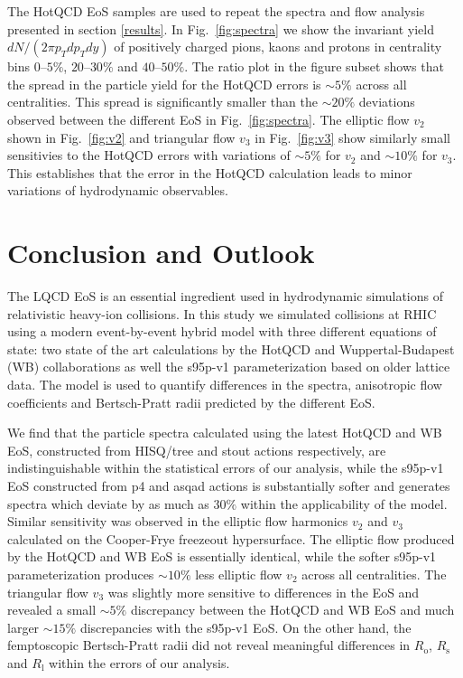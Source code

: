 \documentclass[aps,prc,reprint,amsmath,nofootinbib,superscriptaddress]{revtex4-1}
\begin{document}
The HotQCD EoS samples are used to repeat the spectra and flow analysis presented in section \ref{results}. In Fig.~\ref{fig:spectra} we show the invariant yield $dN/(2\pi p_T dp_T dy)$ of positively charged pions, kaons and protons
in centrality bins $0$--$5\%$, $20$--$30\%$ and $40$--$50\%$. The ratio plot in the figure subset shows that the spread in the particle yield for the HotQCD errors is ${\sim} 5\%$ across all centralities. 
This spread is significantly smaller than the ${\sim}20\%$ deviations observed between the different EoS in Fig.~\ref{fig:spectra}. The elliptic flow $v_2$ shown in Fig.~\ref{fig:v2} and triangular flow $v_3$ in Fig.~\ref{fig:v3}
show similarly small sensitivies to the HotQCD errors with variations of ${\sim}5\%$ for $v_2$ and ${\sim}10\%$ for $v_3$. This establishes that the error in the HotQCD calculation leads to minor variations of hydrodynamic
observables.

\section{Conclusion and Outlook}
\label{conclusion}

The LQCD EoS is an essential ingredient used in hydrodynamic simulations of relativistic heavy-ion collisions. In this study we simulated collisions at RHIC using a modern event-by-event hybrid model with three different equations of state: 
two state of the art calculations by the HotQCD and Wuppertal-Budapest (WB) collaborations as well the s95p-v1 parameterization based on older lattice data. The model is used to quantify differences in the spectra, anisotropic flow coefficients and 
Bertsch-Pratt radii predicted by the different EoS. 

We find that the particle spectra calculated using the latest HotQCD and WB EoS, constructed from HISQ/tree and stout actions respectively, are indistinguishable within the statistical errors of our analysis, while the s95p-v1 EoS constructed from p4 and asqad actions is substantially softer and generates spectra which deviate by as much as $30\%$ within the applicability of the model. 
Similar sensitivity was observed in the elliptic flow harmonics $v_2$ and $v_3$ calculated on the Cooper-Frye freezeout hypersurface. The elliptic flow produced by the HotQCD and WB EoS is essentially identical, while the softer s95p-v1 parameterization produces ${\sim}10\%$ less elliptic flow $v_2$ across all centralities. The triangular flow $v_3$ was slightly more sensitive to differences in the EoS and revealed a small ${\sim} 5\%$ discrepancy between the HotQCD and WB EoS and much larger ${\sim}15\%$ discrepancies with the s95p-v1 EoS. 
On the other hand, the femptoscopic Bertsch-Pratt radii did not reveal meaningful differences in $R_\text{o}$, $R_\text{s}$ and $R_\text{l}$ within the errors of our analysis. 
\end{document}
